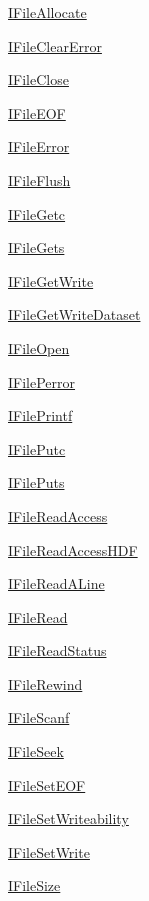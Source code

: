 \begin{DoxyItemize}
\item \hyperlink{ifile_8h_a5bb191751816b8560f059ca213c725a5}{I\+File\+Allocate} \item \hyperlink{ifile_8h_ac4ac8967cccb663f226269e3e56c2332}{I\+File\+Clear\+Error} \item \hyperlink{ifile_8h_a6c8f114749f9cc332e2cf013098671a5}{I\+File\+Close} \item \hyperlink{ifile_8h_aaaf332e19de762dcb8236862d6b5a937}{I\+File\+E\+O\+F} \item \hyperlink{ifile_8h_a6c803c53f6270b21c375b7e07b05f1c8}{I\+File\+Error} \item \hyperlink{ifile_8h_acdc8db0aa84870da8326e8b330d9849a}{I\+File\+Flush} \item \hyperlink{ifile_8h_a825ee82a052e84aa6a0601f6ba11e77a}{I\+File\+Getc} \item \hyperlink{ifile_8h_a3afc35a680bf7e55be809265a899aef8}{I\+File\+Gets} \item \hyperlink{ifile_8h_a8c67218594c24854e1bf9eec02519ece}{I\+File\+Get\+Write} \item \hyperlink{ifile_8h_ada46c060c57740d8109507fd86ab89e7}{I\+File\+Get\+Write\+Dataset} \item \hyperlink{ifile_8h_a659760c048381d534347487e14cd5e25}{I\+File\+Open} \item \hyperlink{ifile_8h_a361dcf308fbd5daa498812775caef88c}{I\+File\+Perror} \item \hyperlink{ifile_8h_af36409944c39397b10b715e02478d560}{I\+File\+Printf} \item \hyperlink{ifile_8h_a8a7e66cd5decd8a753cc05d87e796399}{I\+File\+Putc} \item \hyperlink{ifile_8h_a5a2e70727c241df05141bfebccbea299}{I\+File\+Puts} \item \hyperlink{ifile_8h_ade52718b208c03db3694dbbdcf30a205}{I\+File\+Read\+Access} \item \hyperlink{ifile_8h_a169de07d52b678ebcd4cafa3d7852b79}{I\+File\+Read\+Access\+H\+D\+F} \item \hyperlink{ifile_8h_aef0ba4b82b44ad03f5781d3b5e7021ac}{I\+File\+Read\+A\+Line} \item \hyperlink{ifile_8h_a72ec9c17d545304d3a89fa6bc6145317}{I\+File\+Read} \item \hyperlink{ifile_8h_ad45d5e4d60551a22f2733addc723cc36}{I\+File\+Read\+Status} \item \hyperlink{ifile_8h_a7a163f17d23c422baeebd61229f70c40}{I\+File\+Rewind} \item \hyperlink{ifile_8h_adfedf1cfc33e7e1006f6eeddc98530b1}{I\+File\+Scanf} \item \hyperlink{ifile_8h_a40774bec8a23ec055276666af845a64b}{I\+File\+Seek} \item \hyperlink{ifile_8h_a52b582df33eb77703df1219114a64368}{I\+File\+Set\+E\+O\+F} \item \hyperlink{ifile_8h_aefcce5509a2d88c4c8d6f9c7cd9c9ccd}{I\+File\+Set\+Writeability} \item \hyperlink{ifile_8h_a396268f8a6f981e1d514b6a08d545761}{I\+File\+Set\+Write} \item \hyperlink{ifile_8h_ae4b0643765d564071f1f55f33ebb6e10}{I\+File\+Size} \item 
\end{DoxyItemize}
